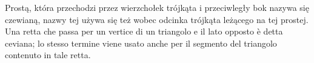 


Prostą, która przechodzi przez wierzchołek trójkąta i przeciwległy bok nazywa się czewianą, nazwy tej używa się też wobec odcinka trójkąta leżącego na tej prostej. %
Una retta che passa per un vertice di un triangolo e il lato opposto è detta ceviana; lo stesso termine viene usato anche per il segmento del triangolo contenuto in tale retta. %

